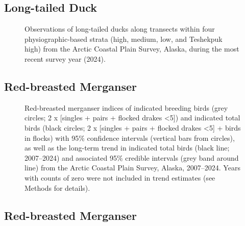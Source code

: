 \documentclass[
]{article}
\begin{document}
\endgroup{}

\newpage{}

\subsection*{Long-tailed Duck}\label{long-tailed-duck-2}

\begin{figure}


\caption{\label{fig-LTDUmap}Observations of long-tailed ducks along
transects within four physiographic-based strata (high, medium, low, and
Teshekpuk high) from the Arctic Coastal Plain Survey, Alaska, during the
most recent survey year (2024).}

\end{figure}%

\newpage{}

\subsection*{Red-breasted Merganser}\label{red-breasted-merganser}

\begin{figure}


\caption{\label{fig-RBME}Red-breasted merganser indices of indicated
breeding birds (grey circles; 2 x {[}singles + pairs + flocked drakes
\textless5{]}) and indicated total birds (black circles; 2 x {[}singles
+ pairs + flocked drakes \textless5{]} + birds in flocks) with 95\%
confidence intervals (vertical bars from circles), as well as the
long-term trend in indicated total birds (black line; 2007--2024) and
associated 95\% credible intervals (grey band around line) from the
Arctic Coastal Plain Survey, Alaska, 2007--2024. Years with counts of
zero were not included in trend estimates (see Methods for details).}

\end{figure}%

\newpage{}

\subsection*{Red-breasted Merganser}\label{red-breasted-merganser-1}
\end{document}
